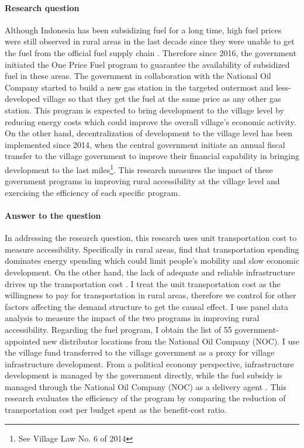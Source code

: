 \documentclass[letterpaper,12pt,leqno]{article}
\begin{document}
\paragraph{Research question} Although Indonesia has been subsidizing fuel for a long time, high fuel prices were still observed in rural areas in the last decade since they were unable to get the fuel from the official fuel supply chain \citep{liputan_2016, jawapos_2017}. Therefore since 2016, the government initiated the One Price Fuel program to guarantee the availability of subsidized fuel in these areas. The government in collaboration with the National Oil Company started to build a new gas station in the targeted outermost and less-developed village so that they get the fuel at the same price as any other gas station. This program is expected to bring development to the village level by reducing energy costs which could improve the overall village's economic activity. On the other hand, decentralization of development to the village level has been implemented since 2014, when the central government initiate an annual fiscal transfer to the village government to improve their financial capability in bringing development to the last miles\footnote{See Village Law No. 6 of 2014}. This research measures the impact of these government programs in improving rural accessibility at the village level and exercising the efficiency of each specific program.

\paragraph{Answer to the question} In addressing the research question, this research uses unit transportation cost to measure accessibility. Specifically in rural areas, \citet{sambodo_2019} find that transportation spending dominates energy spending which could limit people's mobility and slow economic development. On the other hand, the lack of adequate and reliable infrastructure drives up the transportation cost \citep{sandee_2016}. I treat the unit transportation cost as the willingness to pay for transportation in rural areas, therefore we control for other factors affecting the demand structure to get the causal effect. I use panel data analysis to measure the impact of the two programs in improving rural accessibility. Regarding the fuel program, I obtain the list of 55 government-appointed new distributor locations from the National Oil Company (NOC). I use the village fund transferred to the village government as a proxy for village infrastructure development. From a political economy perspective, infrastructure development is managed by the government directly, while the fuel subsidy is managed through the National Oil Company (NOC) as a delivery agent \citep{ichsan_2022}. This research evaluates the efficiency of the program by comparing the reduction of transportation cost per budget spent as the benefit-cost ratio.
\end{document}
